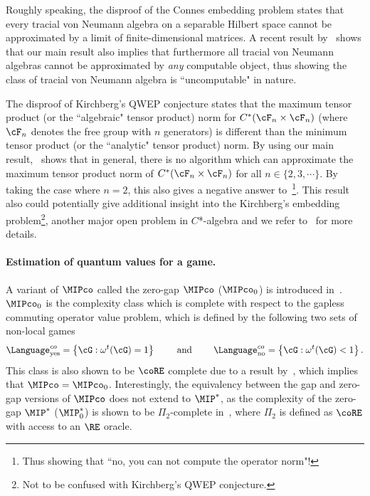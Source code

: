 Roughly speaking, the disproof of the Connes embedding problem states that every tracial von Neumann algebra on a separable Hilbert space cannot be approximated by a limit of finite-dimensional matrices. A recent result by~\cite{arulseelanUniversalTheoryLocally2025} shows that our main result also implies that furthermore all tracial von Neumann algebras cannot be approximated by \emph{any} computable object, thus showing the class of tracial von Neumann algebra is ``uncomputable" in nature. 

The disproof of Kirchberg's QWEP conjecture states that the maximum tensor product (or the ``algebraic" tensor product) norm for $C^*(\cF_n  \times \cF_n)$ (where $\cF_n$ denotes the free group with $n$ generators) is different than the minimum tensor product (or the ``analytic" tensor product) norm. By using our main result,~\cite{goldbringDefinabilityCtensorNorms2025} shows that in general, there is no algorithm which can approximate the maximum tensor product norm of $C^*(\cF_n  \times \cF_n)$ for all $n \in \{2, 3, \cdots \}$. By taking the case where $n=2$, this also gives a negative answer to~\cite[Problem 4.2]{fritzCanYouCompute2014a}\footnote{Thus showing that ``no, you can not compute the operator norm"!}. This result also could potentially give additional insight into the Kirchberg's embedding problem\footnote{Not to be confused with Kirchberg's QWEP conjecture.}, another major open problem in $C$*-algebra and we refer to~\cite{arulseelanUniversalTheoryLocally2025, goldbringKirchbergsEmbeddingProblem2015} for more details. 

\paragraph{Estimation of quantum values for a game.} A variant of $\MIPco$ called the zero-gap $\MIPco$ ($\MIPco_0$) is introduced in~\cite{mousaviComplexityZeroGap2020}. $\MIPco_0$ is the complexity class which is complete with respect to the gapless commuting operator value problem, which is defined by the following two sets of non-local games
\begin{equation*}
	\Language_{\text{yes}}^{co} = \left\{ \cG: \omega^{t}(\cG) = 1 \right\} \qquad \text{ and } \qquad	\Language_{\text{no}}^{co} = \left\{ \cG: \omega^{t}(\cG) < 1 \right\}. 
\end{equation*} 
This class is also shown to be $\coRE$ complete due to a result by~\cite{slofstraTsirelsonProblemEmbedding2019}, which implies that $\MIPco= \MIPco_0$. Interestingly, the equivalency between the gap and zero-gap versions of $\MIPco$ does not extend to $\MIP^*$, as the complexity of the zero-gap $\MIP^*$ ($\MIP^*_0$) is shown to be $\Pi_2$-complete in~\cite{mousaviNonlocalGamesCompression2022}, where $\Pi_2$ is defined as $\coRE$ with access to an $\RE$ oracle.

